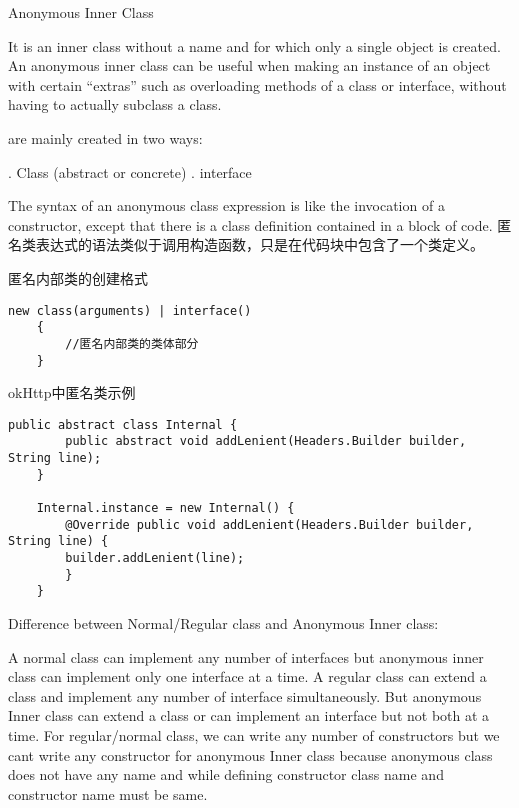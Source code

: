 Anonymous Inner Class

It is an inner class without a name and for which only a single object is created.
An anonymous inner class can be useful when making an instance of an object with certain “extras” such as overloading methods of a class or interface, without having to actually subclass a class.


are mainly created in two ways:

. Class (abstract or concrete)
. interface

The syntax of an anonymous class expression is like the invocation of a constructor, except that there is a class definition contained in a block of code.
匿名类表达式的语法类似于调用构造函数，只是在代码块中包含了一个类定义。

匿名内部类的创建格式

\begin{lstlisting}[style=cjava]
    new class(arguments) | interface()
    {
        //匿名内部类的类体部分
    }
\end{lstlisting}

okHttp中匿名类示例

\begin{lstlisting}[style=cjava]
    public abstract class Internal {
        public abstract void addLenient(Headers.Builder builder, String line);
    }

    Internal.instance = new Internal() {
        @Override public void addLenient(Headers.Builder builder, String line) {
        builder.addLenient(line);
        }
    }
\end{lstlisting}


Difference between Normal/Regular class and Anonymous Inner class:

A normal class can implement any number of interfaces but anonymous inner class can implement only one interface at a time.
A regular class can extend a class and implement any number of interface simultaneously. But anonymous Inner class can extend a class or can implement an interface but not both at a time.
For regular/normal class, we can write any number of constructors but we cant write any constructor for anonymous Inner class because anonymous class does not have any name and while defining constructor class name and constructor name must be same.




